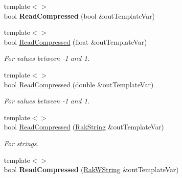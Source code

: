 \begin{DoxyCompactItemize}
\item 
\hypertarget{class_rak_net_1_1_bit_stream_a9b7fbbf52ffc44674d823af0df85225b}{{\footnotesize template$<$$>$ }\\bool {\bfseries Read\-Compressed} (bool \&out\-Template\-Var)}\label{class_rak_net_1_1_bit_stream_a9b7fbbf52ffc44674d823af0df85225b}

\item 
\hypertarget{class_rak_net_1_1_bit_stream_a2d9e41a93c48e6538d3ce3a6c7055144}{{\footnotesize template$<$$>$ }\\bool \hyperlink{class_rak_net_1_1_bit_stream_a2d9e41a93c48e6538d3ce3a6c7055144}{Read\-Compressed} (float \&out\-Template\-Var)}\label{class_rak_net_1_1_bit_stream_a2d9e41a93c48e6538d3ce3a6c7055144}

\begin{DoxyCompactList}\small\item\em For values between -\/1 and 1. \end{DoxyCompactList}\item 
\hypertarget{class_rak_net_1_1_bit_stream_a258dffc96b125c78bb66b0de3ad40f04}{{\footnotesize template$<$$>$ }\\bool \hyperlink{class_rak_net_1_1_bit_stream_a258dffc96b125c78bb66b0de3ad40f04}{Read\-Compressed} (double \&out\-Template\-Var)}\label{class_rak_net_1_1_bit_stream_a258dffc96b125c78bb66b0de3ad40f04}

\begin{DoxyCompactList}\small\item\em For values between -\/1 and 1. \end{DoxyCompactList}\item 
\hypertarget{class_rak_net_1_1_bit_stream_ab2eada178332c4b8067603dfde95dfc0}{{\footnotesize template$<$$>$ }\\bool \hyperlink{class_rak_net_1_1_bit_stream_ab2eada178332c4b8067603dfde95dfc0}{Read\-Compressed} (\hyperlink{class_rak_net_1_1_rak_string}{Rak\-String} \&out\-Template\-Var)}\label{class_rak_net_1_1_bit_stream_ab2eada178332c4b8067603dfde95dfc0}

\begin{DoxyCompactList}\small\item\em For strings. \end{DoxyCompactList}\item 
\hypertarget{class_rak_net_1_1_bit_stream_afa37daefcea06087cbd85c5e7737544d}{{\footnotesize template$<$$>$ }\\bool {\bfseries Read\-Compressed} (\hyperlink{class_rak_net_1_1_rak_w_string}{Rak\-W\-String} \&out\-Template\-Var)}\label{class_rak_net_1_1_bit_stream_afa37daefcea06087cbd85c5e7737544d}


\end{DoxyCompactItemize}
